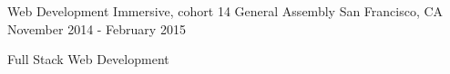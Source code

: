 

\begin{cventries}

  \cventry
    {Web Development Immersive, cohort 14} %
    {General Assembly} %
    {San Francisco, CA} %
    {November 2014 - February 2015} %
    {
      \begin{cvitems} %
        \item {Full Stack Web Development}
      \end{cvitems}
    }
\end{cventries}
